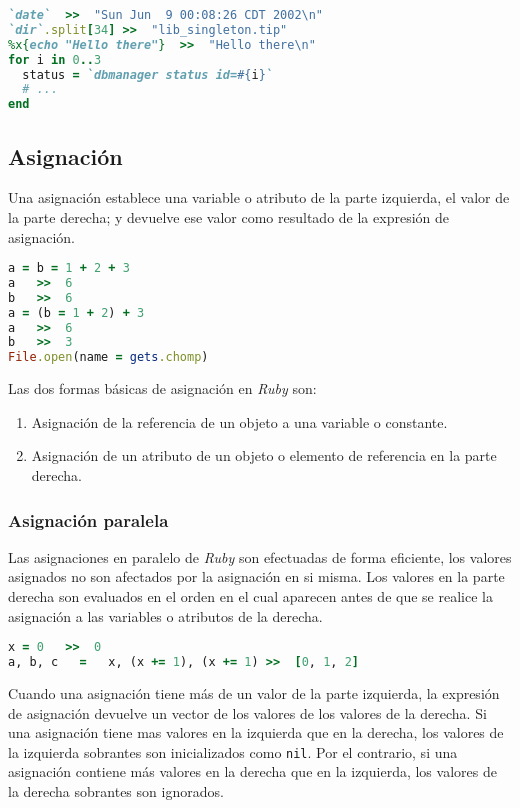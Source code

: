 \begin{lstlisting}[language=Ruby]
`date`	>>	"Sun Jun  9 00:08:26 CDT 2002\n"
`dir`.split[34]	>>	"lib_singleton.tip"
%x{echo "Hello there"}	>>	"Hello there\n"
for i in 0..3
  status = `dbmanager status id=#{i}`
  # ...
end
\end{lstlisting}

\subsection{Asignación}
Una asignación establece una variable o atributo de la parte izquierda, el valor de la parte derecha; y devuelve ese valor como resultado de la expresión de asignación. 

\begin{lstlisting}[language=Ruby]
a = b = 1 + 2 + 3
a	>>	6
b	>>	6
a = (b = 1 + 2) + 3
a	>>	6
b	>>	3
File.open(name = gets.chomp)
\end{lstlisting}

Las dos formas básicas de asignación en \textit{Ruby} son:
\begin{enumerate}
	\item Asignación de la referencia de un objeto a una variable o constante.
	\item Asignación de un atributo de un objeto o elemento de referencia en la parte derecha.
\end{enumerate}

\subsubsection{Asignación paralela}
Las asignaciones en paralelo de \textit{Ruby} son efectuadas de forma eficiente, los valores asignados no son afectados por la asignación en si misma. Los valores en la parte derecha son evaluados en el orden en el cual aparecen antes de que se realice la asignación a las variables o atributos de la derecha.

\begin{lstlisting}[language=Ruby]
x = 0	>>	0
a, b, c   =   x, (x += 1), (x += 1)	>>	[0, 1, 2]
\end{lstlisting}

Cuando una asignación tiene más de un valor de la parte izquierda, la expresión de asignación devuelve un vector de los valores de los valores de la derecha. Si una asignación tiene mas valores en la izquierda que en la derecha, los valores de la izquierda sobrantes son inicializados como \texttt{nil}. Por el contrario, si una asignación contiene más valores en la derecha que en la izquierda, los valores de la derecha sobrantes son ignorados.

